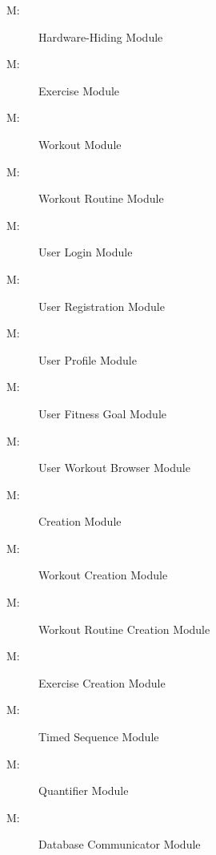 \documentclass[12pt, titlepage]{article}
\newcounter{mnum}
\newcommand{\mthemnum}{M\themnum}
\begin{document}
\begin{description}
\item [ \mthemnum \label{mHH}:] Hardware-Hiding Module
\item [ \mthemnum \label{mExercise}:] Exercise Module
\item [ \mthemnum \label{mWorkout}:] Workout Module
\item [ \mthemnum \label{mWR}:] Workout Routine Module
\item [ \mthemnum \label{mUL}:] User Login Module
\item [ \mthemnum \label{mUR}:] User Registration Module
\item [ \mthemnum \label{mUP}:] User Profile Module
\item [ \mthemnum \label{mUFG}:] User Fitness Goal Module
\item [ \mthemnum \label{mWB}:] User Workout Browser Module
\item [ \mthemnum \label{mCreation}:] Creation Module
\item [ \mthemnum \label{mWC}:] Workout Creation Module
\item [ \mthemnum \label{mWRC}:] Workout Routine Creation Module
\item [ \mthemnum \label{mEC}:] Exercise Creation Module
\item [ \mthemnum \label{mTS}:] Timed Sequence Module
\item [ \mthemnum \label{mQuantifier}:] Quantifier Module
\item [ \mthemnum \label{mDatabase}:] Database Communicator Module
\end{description}
\end{document}
